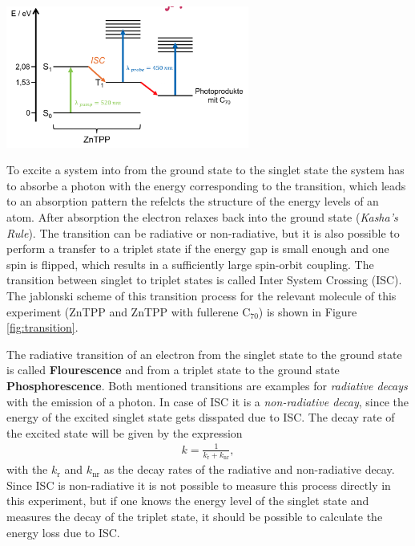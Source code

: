 \begin{center}
    \captionsetup{type = figure}
    \includegraphics[width = 0.6\textwidth]{Pictures/Transition.png}
    \label{fig:transition}
\end{center}
To excite a system into from the ground state to the singlet state the system has to absorbe a photon with the energy corresponding to the transition, which leads to an absorption pattern the refelcts the structure of the energy levels of an atom. After absorption the electron relaxes back into the ground state (\textit{Kasha's Rule}). The transition can be radiative or non-radiative, but it is also possible to perform a transfer to a triplet state if the energy gap is small enough and one spin is flipped, which results in a sufficiently large spin-orbit coupling. The transition between singlet to triplet states is called Inter System Crossing (ISC). The jablonski scheme of this transition process for the relevant molecule of this experiment (ZnTPP and ZnTPP with fullerene $\mathrm{C}_{70}$) is shown in Figure \ref{fig:transition}. 
\bigskip

The radiative transition of an electron from the singlet state to the ground state is called \textbf{Flourescence} and from a triplet state to the ground state \textbf{Phosphorescence}. Both mentioned transitions are examples for \textit{radiative decays} with the emission of a photon. In case of ISC it is a \textit{non-radiative decay}, since the energy of the excited singlet state gets disspated due to ISC. The decay rate of the excited state will be given by the expression
\begin{gather}
    k = \frac{1}{k_\mathrm{r} + k_\mathrm{nr}},
\end{gather}
with the $k_\mathrm{r}$ and $k_\mathrm{nr}$ as the decay rates of the radiative and non-radiative decay. Since ISC is non-radiative it is not possible to measure this process directly in this experiment, but if one knows the energy level of the singlet state and measures the decay of the triplet state, it should be possible to calculate the energy loss due to ISC.